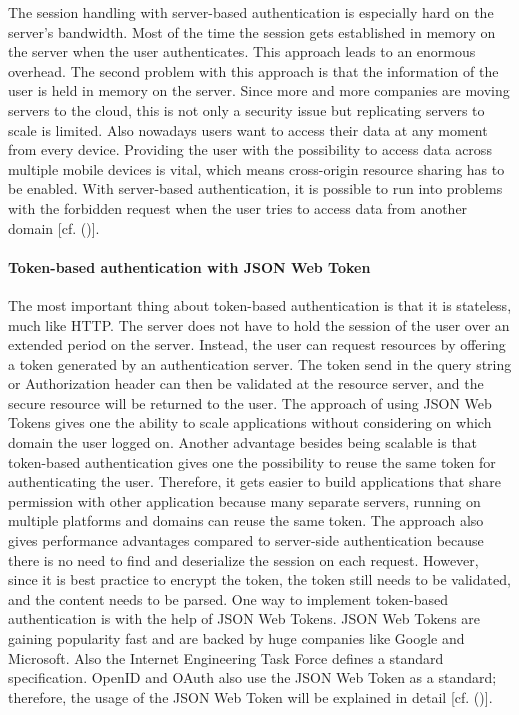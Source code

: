 {The session handling with server-based authentication is especially hard on the server’s bandwidth. Most of the time the session gets established in memory on the server when the user authenticates. This approach leads to an enormous overhead. The second problem with this approach is that the information of the user is held in memory on the server. Since more and more companies are moving servers to the cloud, this is not only a security issue but replicating servers to scale is limited. Also nowadays users want to access their data at any moment from every device. Providing the user with the possibility to access data across multiple mobile devices is vital, which means cross-origin resource sharing has to be enabled. With server-based authentication, it is possible to run into problems with the forbidden request when the user tries to access data from another domain [cf. (\cite{Serilleja:2015:Scothio})].


\paragraph{
	Token-based authentication with JSON Web Token
}

The most important thing about token-based authentication is that it is stateless, much like HTTP. The server does not have to hold the session of the user over an extended period on the server. Instead, the user can request resources by offering a token generated by an authentication server. The token send in the query string or Authorization header can then be validated at the resource server, and the secure resource will be returned to the user. The approach of using JSON Web Tokens gives one the ability to scale applications without considering on which domain the user logged on. Another advantage besides being scalable is that token-based authentication gives one the possibility to reuse the same token for authenticating the user. Therefore, it gets easier to build applications that share permission with other application because many separate servers, running on multiple platforms and domains can reuse the same token. The approach also gives performance advantages compared to server-side authentication because there is no need to find and deserialize the session on each request. However, since it is best practice to encrypt the token, the token still needs to be validated, and the content needs to be parsed. One way to implement token-based authentication is with the help of JSON Web Tokens. JSON Web Tokens are gaining popularity fast and are backed by huge companies like Google and Microsoft. Also the Internet Engineering Task Force defines a standard specification. OpenID and OAuth also use the JSON Web Token as a standard; therefore, the usage of the JSON Web Token will be explained in detail [cf. (\cite{Tkalec:2015})].


}
